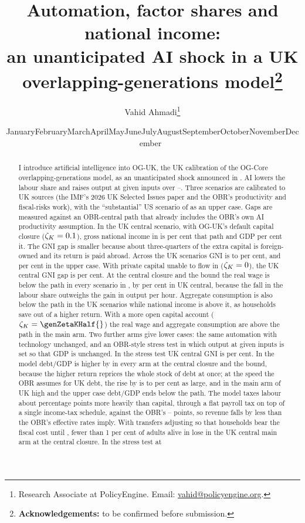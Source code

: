 \documentclass[11pt]{article}
\title{\bfseries Automation, factor shares and national income:\\[0.15cm] an unanticipated AI shock in a UK overlapping-generations model\thanks{\textbf{Acknowledgements:} to be confirmed before submission.}}
\author{Vahid Ahmadi\thanks{Research Associate at PolicyEngine. Email: \href{mailto:vahid@policyengine.org}{vahid@policyengine.org}.}}
\date{\small \ifcase\month\or January\or February\or March\or April\or May\or June\or July\or August\or September\or October\or November\or December\fi\ \the\year}
\newcommand{\zetaK}{\zeta_K}
\begin{document}
\maketitle

\begin{abstract}
\noindent I introduce artificial intelligence into OG-UK, the UK calibration of the OG-Core overlapping-generations model, as an unanticipated shock announced in \genShockYear{}. AI lowers the labour share and raises output at given inputs over \genShockYear--\genHeadYear{}. Three scenarios are calibrated to UK sources (the IMF's 2026 UK Selected Issues paper and the OBR's productivity and fiscal-risks work), with the ``substantial'' US scenario of \citet{korinek2026} as an upper case. Gaps are measured against an OBR-central path that already includes the OBR's own AI productivity assumption. In the UK central scenario, with OG-UK's default capital closure ($\zetaK = \genZetaKCentral{}$), gross national income in \genHeadYear{} is \genUkCentralMainGniCentralAbs{} per cent \genUkCentralMainGniCentralDir{} that path and GDP \genUkCentralMainGdpCentralAbs{} per cent \genUkCentralMainGdpCentralDir{} it. The GNI gap is smaller because about three-quarters of the extra capital is foreign-owned and its return is paid abroad. Across the UK scenarios GNI is \genUkLowMainGniCentralShort{} to \genUkHighMainGniCentralShort{} per cent, and \genKorinekMainGniCentralShort{} per cent in the upper case. With private capital unable to flow in ($\zetaK = \genZetaKBound{}$), the UK central GNI gap is \genUkCentralMainGniBoundShort{} per cent. At the central closure and the bound the real wage is below the path in every scenario in \genHeadYear{}, by \genUkCentralMainWageCentralAbs{} per cent in UK central, because the fall in the labour share outweighs the gain in output per hour. Aggregate consumption is also below the path in the UK scenarios while national income is above it, as households save out of a higher return. With a more open capital account ($\zetaK = \genZetaKHalf{}$) the real wage and aggregate consumption are above the path in the main arm. Two further arms give lower cases: the same automation with technology unchanged, and an OBR-style stress test in which output at given inputs is set so that \genHeadYear{} GDP is unchanged. In the stress test UK central GNI is \genUkCentralStressGniCentralShort{} per cent. In the model debt/GDP is higher by \genDebtRuleYear{} in every arm at the central closure and the bound, because the higher return reprices the whole stock of debt at once; at the speed the OBR assumes for UK debt, the rise by \genDebtRuleYear{} is \genRepriceRatioMinPct{} to \genRepriceRatioMaxPct{} per cent as large, and in the main arm of UK high and the upper case debt/GDP ends below the path. The model taxes labour about \genEffWedgePpCentral{} percentage points more heavily than capital, through a flat payroll tax on top of a single income-tax schedule, against the OBR's \genObrWedgeLo--\genObrWedgeHi{} points, so revenue falls by less than the OBR's effective rates imply. With transfers adjusting so that households bear the fiscal cost until \genLastFlowYear{}, fewer than 1 per cent of adults alive in \genShockYear{} lose in the UK central main arm at the central closure. In the stress test at 
\end{abstract}
\end{document}
